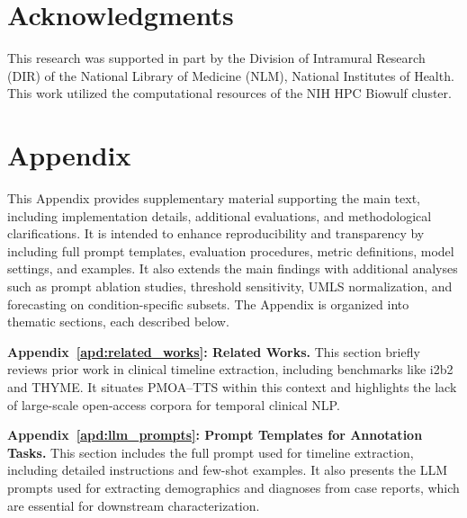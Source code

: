 \documentclass{article}
\begin{document}
\clearpage
\section*{Acknowledgments}
This research was supported in part by the Division of Intramural Research (DIR) of the National Library of Medicine (NLM), National Institutes of Health. This work utilized the computational resources of the NIH HPC Biowulf cluster.





\newpage
\appendix


% 
\clearpage

\section*{Appendix}

This Appendix provides supplementary material supporting the main text, including implementation details, additional evaluations, and methodological clarifications. It is intended to enhance reproducibility and transparency by including full prompt templates, evaluation procedures, metric definitions, model settings, and examples. It also extends the main findings with additional analyses such as prompt ablation studies, threshold sensitivity, UMLS normalization, and forecasting on condition-specific subsets. The Appendix is organized into thematic sections, each described below.

\textbf{Appendix~\ref{apd:related_works}: Related Works.} This section briefly reviews prior work in clinical timeline extraction, including benchmarks like i2b2 and THYME. It situates PMOA–TTS within this context and highlights the lack of large-scale open-access corpora for temporal clinical NLP.

\textbf{Appendix~\ref{apd:llm_prompts}: Prompt Templates for Annotation Tasks.} This section includes the full prompt used for timeline extraction, including detailed instructions and few-shot examples. It also presents the LLM prompts used for extracting demographics and diagnoses from case reports, which are essential for downstream characterization.
\end{document}
